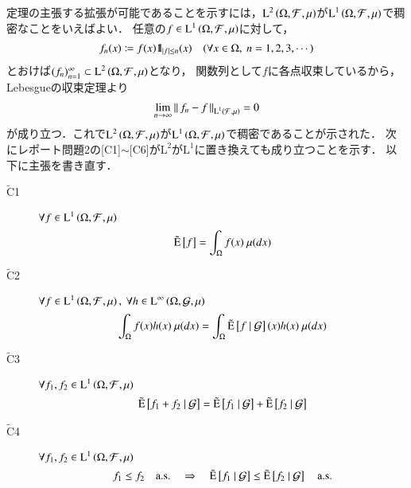 	\begin{prf}	
		定理の主張する拡張が可能であることを示すには，$\operatorname{L}^{2} \left(\Omega,\mathcal{F},\mu\right)$が$\operatorname{L}^{1} \left(\Omega,\mathcal{F},\mu\right)$で稠密なことをいえばよい．
		任意の$f \in \operatorname{L}^{1} \left(\Omega,\mathcal{F},\mu\right)$に対して，
		\begin{align}
			f_n(x) \coloneqq f(x) \mbox{1}\hspace{-0.25em}\mbox{l}_{|f| \leq n} (x) \quad (\forall x \in \Omega,\ n=1,2,3,\cdots) \label{conditional_exp_expansion}
		\end{align}
		とおけば$(f_n)_{n=1}^{\infty} \subset \operatorname{L}^{2} \left(\Omega,\mathcal{F},\mu\right)$となり，
		関数列として$f$に各点収束しているから，Lebesgueの収束定理より
		\begin{align}
			\lim_{n \to \infty} \left\|\, f_n - f\, \right\|_{\operatorname{L}^{1} \left(\mathcal{F},\mu\right)} = 0
		\end{align}
		が成り立つ．これで$\operatorname{L}^{2} \left(\Omega,\mathcal{F},\mu\right)$が$\operatorname{L}^{1} \left(\Omega,\mathcal{F},\mu\right)$で稠密であることが示された．
		次にレポート問題2の[C1]$\sim$[C6]が$\mathrm{L}^2$が$\mathrm{L}^1$に置き換えても成り立つことを示す．
		以下に主張を書き直す．
		\begin{description}
			\item[$\tilde{\mathrm{C}}$1] $\forall f \in \operatorname{L}^{1} \left(\Omega, \mathcal{F},\mu\right)$
				\begin{align}
					\tilde{\operatorname{E}} \left[ f \right] = \int_{\Omega} f(x)\ \mu(dx)
				\end{align}
				
			\item[$\tilde{\mathrm{C}}$2]	$\forall f \in \operatorname{L}^{1} \left(\Omega, \mathcal{F},\mu\right),\ \forall h \in \operatorname{L}^{\infty} \left(\Omega, \mathcal{G},\mu\right)$
				\begin{align}
					\int_{\Omega} f(x)h(x)\ \mu(dx) = \int_{\Omega} \tilde{\operatorname{E}} \left[ f \ \middle|\ \mathcal{G} \right](x)h(x)\ \mu(dx)
				\end{align}
				
			\item[$\tilde{\mathrm{C}}$3]	$\forall f_1,f_2 \in \operatorname{L}^{1} \left(\Omega, \mathcal{F},\mu\right)$
				\begin{align}
					\tilde{\operatorname{E}} \left[ f_1 + f_2 \ \middle|\ \mathcal{G} \right] = \tilde{\operatorname{E}} \left[ f_1 \ \middle|\ \mathcal{G} \right] + \tilde{\operatorname{E}} \left[ f_2 \ \middle|\ \mathcal{G} \right]
				\end{align}

			\item[$\tilde{\mathrm{C}}$4]	$\forall f_1,f_2 \in \operatorname{L}^{1} \left(\Omega, \mathcal{F},\mu\right)$
				\begin{align}
					f_1 \leq f_2 \quad \mathrm{a.s.} \quad \Rightarrow \quad \tilde{\operatorname{E}} \left[ f_1 \ \middle|\ \mathcal{G} \right] \leq \tilde{\operatorname{E}} \left[ f_2 \ \middle|\ \mathcal{G} \right] \quad \mathrm{a.s.}
				\end{align}
			

\end{description}
\end{prf}
